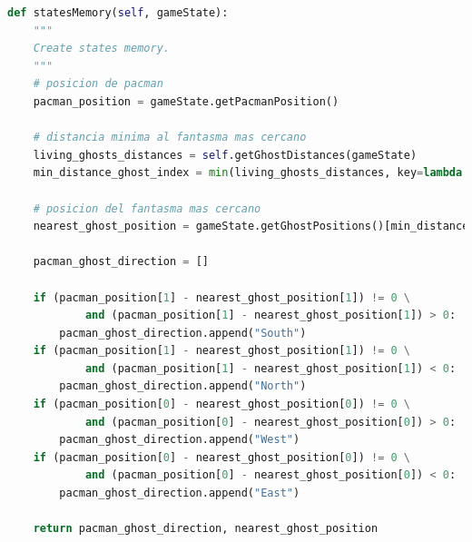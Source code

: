\documentclass[11pt]{exam}
\begin{document}
\begin{lstlisting}[caption={Función statesMemory.}, label={statesMemory}, language=python, basicstyle=\footnotesize]
def statesMemory(self, gameState):
	"""
	Create states memory.
	"""
	# posicion de pacman
	pacman_position = gameState.getPacmanPosition()
	
	# distancia minima al fantasma mas cercano
	living_ghosts_distances = self.getGhostDistances(gameState)
	min_distance_ghost_index = min(living_ghosts_distances, key=lambda t: t[1])[0]
	
	# posicion del fantasma mas cercano
	nearest_ghost_position = gameState.getGhostPositions()[min_distance_ghost_index]
	
	pacman_ghost_direction = []
	
	if (pacman_position[1] - nearest_ghost_position[1]) != 0 \
			and (pacman_position[1] - nearest_ghost_position[1]) > 0:
		pacman_ghost_direction.append("South")
	if (pacman_position[1] - nearest_ghost_position[1]) != 0 \
			and (pacman_position[1] - nearest_ghost_position[1]) < 0:
		pacman_ghost_direction.append("North")
	if (pacman_position[0] - nearest_ghost_position[0]) != 0 \
			and (pacman_position[0] - nearest_ghost_position[0]) > 0:
		pacman_ghost_direction.append("West")
	if (pacman_position[0] - nearest_ghost_position[0]) != 0 \
			and (pacman_position[0] - nearest_ghost_position[0]) < 0:
		pacman_ghost_direction.append("East")
	
	return pacman_ghost_direction, nearest_ghost_position
\end{lstlisting}
\end{document}
